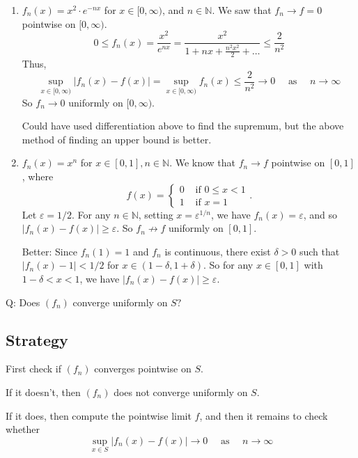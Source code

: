\documentclass[a4paper]{article}
\begin{document}
\begin{example}
\begin{enumerate}
    \item $f_{n}(x)=x^{2} \cdot e^{-n x}$ for $x \in[0, \infty)$, and $n \in \mathbb{N}$. We saw that $f_{n} \rightarrow f=0$ pointwise on $[0, \infty)$.
    \[
    0 \leqslant f_{n}(x)=\frac{x^{2}}{e^{n x}}=\frac{x^{2}}{1+n x+\frac{n^{2} x^{2}}{2}+\ldots} \leqslant \frac{2}{n^2}
    \]
    Thus,
    \[
    \sup _{x \in[0, \infty)}\left|f_{n}(x)-f(x)\right|=\sup _{x \in[0, \infty)} f_{n}(x) \leqslant \frac{2}{n^{2}} \rightarrow 0 \quad \text { as } \quad n \rightarrow \infty
    \]
    So $f_{n} \rightarrow 0$ uniformly on $[0, \infty)$.

    Could have used differentiation above to find the supremum, but the above method of finding an upper bound is better.
    \item $f_{n}(x)=x^{n}$ for $x \in[0,1], n \in \mathbb{N}$.
    We know that $f_{n} \rightarrow f$ pointwise on $[0,1]$, where
    \[
        f(x)= \begin{cases}0 & \text { if } 0 \leqslant x<1 \\ 1 & \text { if } x=1\end{cases}.
    \]
    Let $\varepsilon=1 / 2$. For any $n \in \mathbb{N}$, setting $x=\varepsilon^{1 / n}$, we have $f_{n}(x)=\varepsilon$, and so $\left|f_{n}(x)-f(x)\right| \geqslant \varepsilon$. So $f_{n} \not \rightarrow  f$ uniformly on $[0,1]$.

    Better: Since $f_{n}(1)=1$ and $f_{n}$ is continuous, there exist $\delta>0$ such that $\left|f_{n}(x)-1\right|<1 / 2$ for $x \in(1-\delta, 1+\delta)$. So for any $x \in[0,1]$ with $1-\delta<x<1$, we have $\left|f_{n}(x)-f(x)\right| \geqslant \varepsilon$.
\end{enumerate}
\end{example}
Q: Does $\left(f_{n}\right)$ converge uniformly on $S ?$
\subsection*{Strategy}
First check if $\left(f_{n}\right)$ converges pointwise on $S$.

If it doesn't, then $\left(f_{n}\right)$ does not converge uniformly on $S$.

If it does, then compute the pointwise limit $f$, and then it remains to check whether
\[
\sup _{x \in S}\left|f_{n}(x)-f(x)\right| \rightarrow 0 \quad \text { as } \quad n \rightarrow \infty
\]
\end{document}

